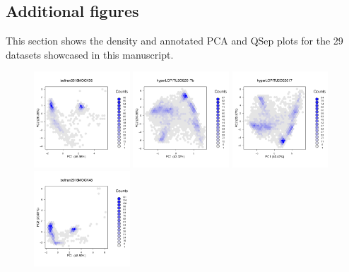 \documentclass[12pt]{article}\usepackage[]{graphicx}\usepackage[]{color}
\begin{document}
\newpage

\begin{appendices}

\section{Additional figures}\label{sec:figs}

This section shows the density and annotated PCA and QSep plots for
the 29 datasets showcased in this manuscript.

\begin{figure}[htb]
  \centering
  \includegraphics[width = 0.32\textwidth]{./figure/fighexpca-1.pdf}
  \includegraphics[width = 0.32\textwidth]{./figure/fighexpca-2.pdf}
  \includegraphics[width = 0.32\textwidth]{./figure/fighexpca-3.pdf}
  \includegraphics[width = 0.32\textwidth]{./figure/fighexpca-4.pdf}

\end{figure}
\end{appendices}
\end{document}
